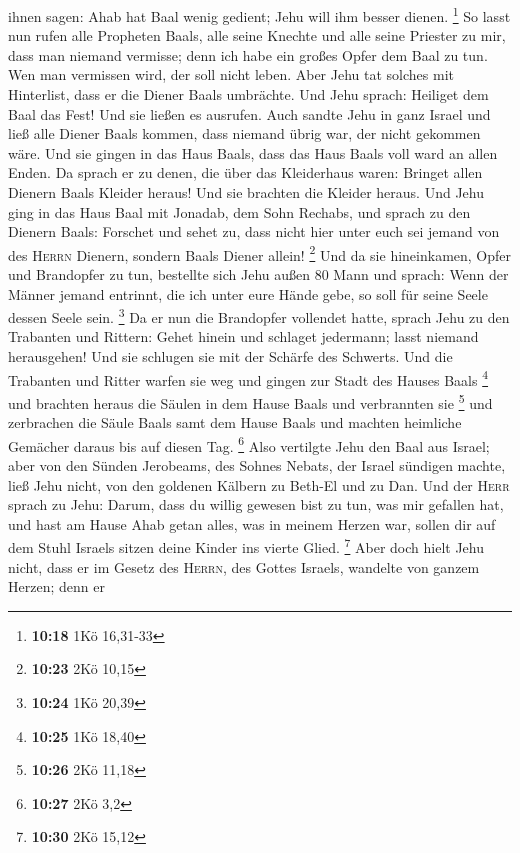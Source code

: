 ihnen sagen: Ahab hat Baal wenig gedient; Jehu will ihm besser dienen.
\footnote{\textbf{10:18} 1Kö 16,31-33}  So lasst nun
rufen alle Propheten Baals, alle seine Knechte und alle seine Priester
zu mir, dass man niemand vermisse; denn ich habe ein großes Opfer dem
Baal zu tun. Wen man vermissen wird, der soll nicht leben. Aber Jehu tat
solches mit Hinterlist, dass er die Diener Baals umbrächte.
 Und Jehu sprach: Heiliget dem Baal das Fest! Und sie
ließen es ausrufen.  Auch sandte Jehu in ganz Israel und
ließ alle Diener Baals kommen, dass niemand übrig war, der nicht
gekommen wäre. Und sie gingen in das Haus Baals, dass das Haus Baals
voll ward an allen Enden.  Da sprach er zu denen, die
über das Kleiderhaus waren: Bringet allen Dienern Baals Kleider heraus!
Und sie brachten die Kleider heraus.  Und Jehu ging in
das Haus Baal mit Jonadab, dem Sohn Rechabs, und sprach zu den Dienern
Baals: Forschet und sehet zu, dass nicht hier unter euch sei jemand von
des \textsc{Herrn} Dienern, sondern Baals Diener allein! \footnote{\textbf{10:23}
  2Kö 10,15}  Und da sie hineinkamen, Opfer und
Brandopfer zu tun, bestellte sich Jehu außen 80 Mann und sprach: Wenn
der Männer jemand entrinnt, die ich unter eure Hände gebe, so soll für
seine Seele dessen Seele sein. \footnote{\textbf{10:24} 1Kö 20,39}
 Da er nun die Brandopfer vollendet hatte, sprach Jehu zu
den Trabanten und Rittern: Gehet hinein und schlaget jedermann; lasst
niemand herausgehen! Und sie schlugen sie mit der Schärfe des Schwerts.
Und die Trabanten und Ritter warfen sie weg und gingen zur Stadt des
Hauses Baals \footnote{\textbf{10:25} 1Kö 18,40}  und
brachten heraus die Säulen in dem Hause Baals und verbrannten sie
\footnote{\textbf{10:26} 2Kö 11,18}  und zerbrachen die
Säule Baals samt dem Hause Baals und machten heimliche Gemächer daraus
bis auf diesen Tag. \footnote{\textbf{10:27} 2Kö 3,2} 
Also vertilgte Jehu den Baal aus Israel;  aber von den
Sünden Jerobeams, des Sohnes Nebats, der Israel sündigen machte, ließ
Jehu nicht, von den goldenen Kälbern zu Beth-El und zu Dan.
 Und der \textsc{Herr} sprach zu Jehu: Darum, dass du
willig gewesen bist zu tun, was mir gefallen hat, und hast am Hause Ahab
getan alles, was in meinem Herzen war, sollen dir auf dem Stuhl Israels
sitzen deine Kinder ins vierte Glied. \footnote{\textbf{10:30} 2Kö 15,12}
 Aber doch hielt Jehu nicht, dass er im Gesetz des
\textsc{Herrn}, des Gottes Israels, wandelte von ganzem Herzen; denn er
